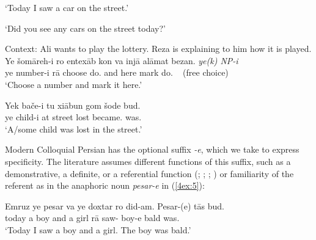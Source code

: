 \documentclass[output=paper]{langsci/langscibook}
\begin{document}
\begin{exe}
\glt `Today I saw a car on the street.'

\glt	`Did you see any cars on the street today?'

\ex\label{4ex:3}
Context: Ali wants to play the lottery. Reza is explaining to him how it is played.
\exi{}
\gll	Ye šomāreh-i  ro 	entexāb   kon        va  injā		alāmat 	bezan.			\hspace*{0.6cm} {\emph{ye(k) NP-i}}\hspace*{-4mm}\\
	ye number-i   rā 	choose    do.{}  and here  	mark    	do.{}	 ~ {(free choice)\hspace*{-4mm}}\\
\glt	`Choose a number and mark it here.'

\ex\label{4ex:4}
\gll	Yek bače-i		tu xiābun	gom	šode				bud.			\\
	ye     child-i   	at street	lost	became.{\sc{3sg}} 	was.{}	  \\
\glt	`A/some child was lost in the street.'
\end{exe}

Modern Colloquial Persian has the optional suffix {\emph{-e}}, which we take to express specificity. The literature assumes different functions of this suffix, such as a demonstrative, a definite, or a referential function (\citealt[][40]{windfuhr:79}; \citealt[][173-177]{hincha:61}; \citealt[][163]{lazard:57}; \citealt[][67]{ghomeshi:03}) or familiarity of the referent \citep{hedberg:etal:09} as in the anaphoric noun {\emph{pesar-e}} in (\ref{4ex:5}):

\begin{exe}
\ex\label{4ex:5}
\gll	Emruz	ye 	pesar	va	ye 	doxtar 	ro   did-am.    		Pesar-(e)	tās	bud. \\
	today	a	boy		and	a	girl      	rā   saw-{} 	boy-e	bald 	was.{} \\
\glt	`Today I saw a boy and a girl. The boy was bald.'
\end{exe}
\end{document}
